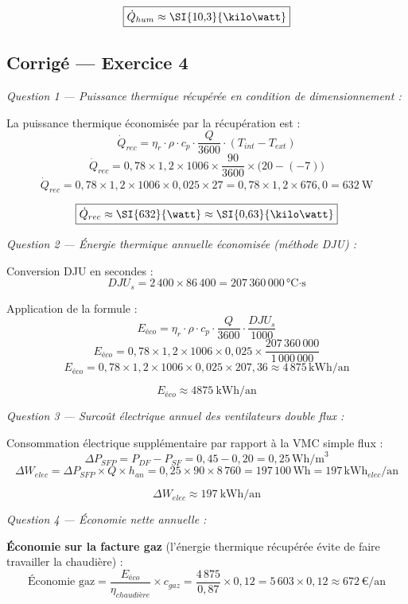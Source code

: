 \[
  \boxed{\dot{Q}_{hum} \approx \SI{10{,}3}{\kilo\watt}}
\]


\subsection*{Corrigé — Exercice 4}

\textit{Question 1 — Puissance thermique récupérée en condition de dimensionnement :}

La puissance thermique économisée par la récupération est :
\[
  \dot{Q}_{rec} = \eta_r \cdot \rho \cdot c_p \cdot \frac{Q}{3600} \cdot (T_{int} - T_{ext})
\]
\[
  \dot{Q}_{rec} = 0{,}78 \times 1{,}2 \times 1006 \times \frac{90}{3600} \times \bigl(20 - (-7)\bigr)
\]
\[
  \dot{Q}_{rec} = 0{,}78 \times 1{,}2 \times 1006 \times 0{,}025 \times 27 = 0{,}78 \times 1{,}2 \times 676{,}0 = \SI{632}{\watt}
\]

\[
  \boxed{\dot{Q}_{rec} \approx \SI{632}{\watt} \approx \SI{0{,}63}{\kilo\watt}}
\]

\textit{Question 2 — Énergie thermique annuelle économisée (méthode DJU) :}

Conversion DJU en secondes :
\[
  DJU_{s} = 2\,400 \times 86\,400 = 207\,360\,000\,\text{°C·s}
\]

Application de la formule :
\[
  E_{éco} = \eta_r \cdot \rho \cdot c_p \cdot \frac{Q}{3600} \cdot \frac{DJU_s}{1000}
\]
\[
  E_{éco} = 0{,}78 \times 1{,}2 \times 1006 \times 0{,}025 \times \frac{207\,360\,000}{1\,000\,000}
\]
\[
  E_{éco} = 0{,}78 \times 1{,}2 \times 1006 \times 0{,}025 \times 207{,}36 \approx 4\,875\,\text{kWh/an}
\]

\[
  \boxed{E_{éco} \approx \SI{4875}{\kilo\watt\hour}/\text{an}}
\]

\textit{Question 3 — Surcoût électrique annuel des ventilateurs double flux :}

Consommation électrique supplémentaire par rapport à la VMC simple flux :
\[
  \Delta P_{SFP} = P_{DF} - P_{SF} = 0{,}45 - 0{,}20 = 0{,}25\,\text{Wh/m}^3
\]
\[
  \Delta W_{elec} = \Delta P_{SFP} \times Q \times h_{an} = 0{,}25 \times 90 \times 8\,760 = 197\,100\,\text{Wh} = 197\,\text{kWh}_{elec}/\text{an}
\]

\[
  \boxed{\Delta W_{elec} \approx \SI{197}{\kilo\watt\hour}/\text{an}}
\]

\textit{Question 4 — Économie nette annuelle :}

\textbf{Économie sur la facture gaz} (l'énergie thermique récupérée évite de faire travailler la chaudière) :
\[
  \text{Économie gaz} = \frac{E_{éco}}{\eta_{chaudière}} \times c_{gaz} = \frac{4\,875}{0{,}87} \times 0{,}12 = 5\,603 \times 0{,}12 \approx 672\,\text{€/an}
\]

